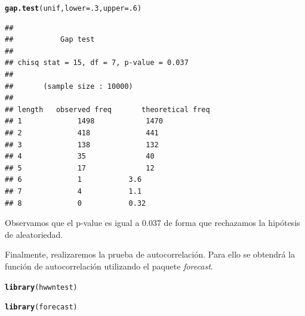 \documentclass[12 pt]{article}\usepackage[]{graphicx}\usepackage[]{color}
\makeatletter
\newcommand{\hlnum}[1]{\textcolor[rgb]{0.686,0.059,0.569}{#1}}%
\newcommand{\hlstd}[1]{\textcolor[rgb]{0.345,0.345,0.345}{#1}}%
\newcommand{\hlkwc}[1]{\textcolor[rgb]{0.333,0.667,0.333}{#1}}%
\newcommand{\hlkwd}[1]{\textcolor[rgb]{0.737,0.353,0.396}{\textbf{#1}}}%
\newenvironment{kframe}{%
 \def\at@end@of@kframe{}%
 \ifinner\ifhmode%
  \def\at@end@of@kframe{\end{minipage}}%
  \begin{minipage}{\columnwidth}%
 \fi\fi%
 \def\FrameCommand##1{\hskip\@totalleftmargin \hskip-\fboxsep
 \colorbox{shadecolor}{##1}\hskip-\fboxsep
     \hskip-\linewidth \hskip-\@totalleftmargin \hskip\columnwidth}%
 \MakeFramed {\advance\hsize-\width
   \@totalleftmargin\z@ \linewidth\hsize
   \@setminipage}}%
 {\par\unskip\endMakeFramed%
 \at@end@of@kframe}
\newenvironment{knitrout}{}{} %
\makeatother
\begin{document}
\begin{enumerate}
\begin{knitrout}
\color{fgcolor}\begin{kframe}
\begin{alltt}
\hlkwd{gap.test}\hlstd{(unif,} \hlkwc{lower} \hlstd{=} \hlnum{.3}\hlstd{,} \hlkwc{upper} \hlstd{=} \hlnum{.6}\hlstd{)}
\end{alltt}
\begin{verbatim}
## 
## 			 Gap test
## 
## chisq stat = 15, df = 7, p-value = 0.037
## 
## 		 (sample size : 10000)
## 
## length	observed freq		theoretical freq
## 1 			 1498 			 1470 
## 2 			 418 			 441 
## 3 			 138 			 132 
## 4 			 35 			 40 
## 5 			 17 			 12 
## 6 			 1 			 3.6 
## 7 			 4 			 1.1 
## 8 			 0 			 0.32
\end{verbatim}
\end{kframe}
\end{knitrout}

Observamos que el p-value es igual a 0.037 de forma que rechazamos la hipótesis de aleatoriedad.

Finalmente, realizaremos la prueba de autocorrelación. Para ello se obtendrá la función de autocorrelación utilizando el paquete \textit{forecast}.

\begin{knitrout}
\color{fgcolor}\begin{kframe}
\begin{alltt}
\hlkwd{library}\hlstd{(hwwntest)}
\end{alltt}


{\ttfamily\noindent\bfseries\color{errorcolor}{\#\# Error in library(hwwntest): there is no package called 'hwwntest'}}\begin{alltt}
\hlkwd{library}\hlstd{(forecast)}


\end{alltt}
\end{kframe}
\end{knitrout}
\end{enumerate}
\end{document}
